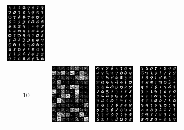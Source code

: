 \documentclass[conference]{IEEEtran}
\begin{document}
\begin{figure}[H]
\begin{tabular}{cccc}
                \includegraphics[width=2cm]{fig/mnist-5-vae.png}\\
		10 &
		\includegraphics[width=2cm]{fig/mnist-10-false.png}&
		\includegraphics[width=2cm]{fig/mnist-10-true.png}&
		\includegraphics[width=2cm]{fig/mnist-10-vae.png}
        \end{tabular}
\end{figure}
\end{document}
